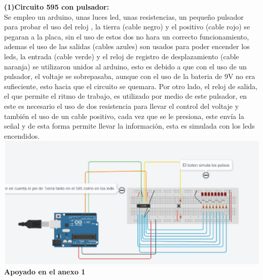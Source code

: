 \documentclass{article}
\begin{document}
\textbf{(1)Circuito 595 con pulsador:} \\
\justify Se empleo un arduino, unas luces led, unas resistencias, un pequeño pulsador para probar el uso del reloj , la tierra (cable negro) y el positivo (cable rojo) se pegaran a la placa, sin el uso de estos dos no hara un correcto funcionamiento, ademas el uso de las salidas (cables azules) son usados para poder encender los leds, la entrada (cable verde) y el reloj de registro de desplazamiento (cable naranja) se utilizaron unidos al arduino, esto es debido a que con el uso de un pulsador, el voltaje se sobrepasaba, aunque con el uso de la bateria de 9V no era sufieciente, esto hacia que el circuito se quemara. Por otro lado, el reloj de salida, el que permite el ritmo de trabajo, es utilizado por medio de este pulsador, en este es necesario el uso de dos resistencia para llevar el control del voltaje y también el uso de un cable positivo, cada vez que se le presiona, este envía la señal y de esta forma permite llevar la información, esta es simulada con los leds encendidos.
\newline
\newline
\newline
\includegraphics[scale=0.5]{figura2}
\centering
\textbf{Apoyado en el anexo 1}
\newline
\newline
\newline
\end{document}
